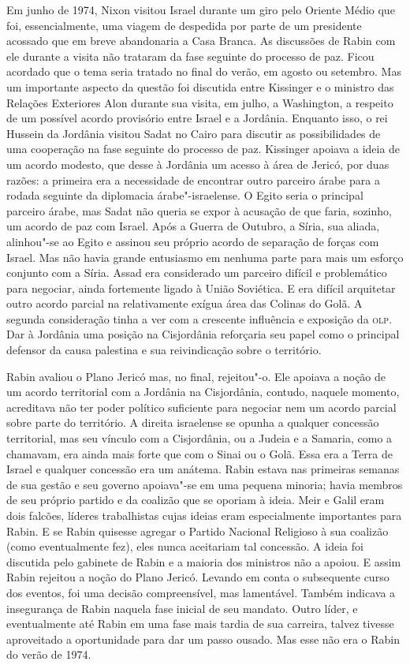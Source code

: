 Em junho de 1974, Nixon visitou Israel durante um giro pelo Oriente Médio
que foi, essencialmente, uma viagem de despedida por parte de um
presidente acossado que em breve abandonaria a Casa Branca. As
discussões de Rabin com ele durante a visita não trataram da fase
seguinte do processo de paz. Ficou acordado que o tema seria tratado no
final do verão, em agosto ou setembro. Mas um importante aspecto da
questão foi discutida entre Kissinger e o ministro das Relações
Exteriores Alon durante sua visita, em julho, a Washington,
a respeito de um possível acordo provisório entre Israel e a
Jordânia. Enquanto isso, o rei Hussein da Jordânia visitou Sadat no
Cairo para discutir as possibilidades de uma cooperação na fase seguinte
do processo de paz. Kissinger apoiava a ideia de um acordo modesto, que
desse à Jordânia um acesso à área de Jericó, por duas razões: a primeira
era a necessidade de encontrar outro parceiro árabe para a rodada
seguinte da diplomacia árabe"-israelense. O Egito seria o principal
parceiro árabe, mas Sadat não queria se expor à acusação de que faria,
sozinho, um acordo de paz com Israel. Após a Guerra de Outubro, a Síria,
sua aliada, alinhou"-se ao Egito e assinou seu próprio acordo
de separação de forças com Israel. Mas não havia grande entusiasmo em
nenhuma parte para mais um esforço conjunto com a Síria. Assad era
considerado um parceiro difícil e problemático para negociar, ainda
fortemente ligado à União Soviética. E era difícil arquitetar outro
acordo parcial na relativamente exígua área das Colinas do Golã. A
segunda consideração tinha a ver com a crescente influência e exposição
da \textsc{olp}. Dar à Jordânia uma posição na Cisjordânia reforçaria seu papel
como o principal defensor da causa palestina e sua reivindicação sobre o
território.

Rabin avaliou o Plano Jericó mas, no final, rejeitou"-o. Ele apoiava a
noção de um acordo territorial com a Jordânia na Cisjordânia, contudo,
naquele momento, acreditava não ter poder político suficiente para
negociar nem um acordo parcial sobre parte do território. A direita
israelense se opunha a qualquer concessão territorial, mas seu vínculo
com a Cisjordânia, ou a Judeia e a Samaria, como a chamavam, era ainda
mais forte que com o Sinai ou o Golã. Essa era a Terra de Israel e
qualquer concessão era um anátema. Rabin estava nas primeiras semanas de
sua gestão e seu governo apoiava"-se em uma pequena minoria; havia
membros de seu próprio partido e da coalizão que se oporiam à ideia.
Meir e Galil eram dois falcões, líderes trabalhistas cujas ideias eram
especialmente importantes para Rabin. E se Rabin quisesse agregar o
Partido Nacional Religioso à sua coalizão (como eventualmente fez),
eles nunca aceitariam tal concessão. A ideia foi discutida pelo gabinete
de Rabin e a maioria dos ministros não a apoiou. E assim Rabin rejeitou
a noção do Plano Jericó. Levando em conta o subsequente curso dos
eventos, foi uma decisão compreensível, mas lamentável. Também indicava
a insegurança de Rabin naquela fase inicial de seu mandato. Outro líder,
e eventualmente até Rabin em uma fase mais tardia de sua carreira, talvez
tivesse aproveitado a oportunidade para dar um passo ousado. Mas esse
não era o Rabin do verão de 1974.

